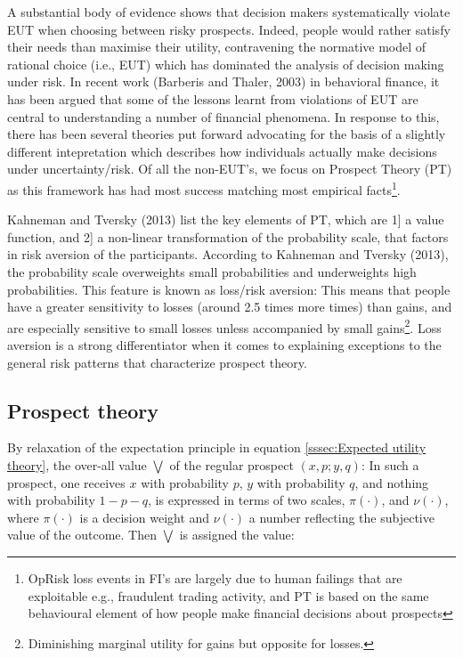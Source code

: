 \documentclass[]{DissertateUSU}
\let\rmarkdownfootnote\footnote%
\def\footnote{\protect\rmarkdownfootnote}
\begin{document}
A substantial body of evidence shows that decision makers systematically
violate EUT when choosing between risky prospects. Indeed, people would
rather satisfy their needs than maximise their utility, contravening the
normative model of rational choice (i.e., EUT) which has dominated the
analysis of decision making under risk. In recent work (Barberis and
Thaler, 2003) in behavioral finance, it has been argued that some of the
lessons learnt from violations of EUT are central to understanding a
number of financial phenomena. In response to this, there has been
several theories put forward advocating for the basis of a slightly
different intepretation which describes how individuals actually make
decisions under uncertainty/risk. Of all the non-EUT's, we focus on
Prospect Theory (PT) as this framework has had most success matching
most empirical
facts\footnote{OpRisk loss events in FI's are largely due to human failings that are exploitable e.g., fraudulent trading activity, and PT is based on the same behavioural element of how people make financial decisions about prospects}.\medskip 

Kahneman and Tversky (2013) list the key elements of PT, which are 1{]}
a value function, and 2{]} a non-linear transformation of the
probability scale, that factors in risk aversion of the participants.
According to Kahneman and Tversky (2013), the probability scale
overweights small probabilities and underweights high probabilities.
This feature is known as loss/risk aversion: This means that people have
a greater sensitivity to losses (around 2.5 times more times) than
gains, and are especially sensitive to small losses unless accompanied
by small
gains\footnote{Diminishing marginal utility for gains but opposite for losses.}.
Loss aversion is a strong differentiator when it comes to explaining
exceptions to the general risk patterns that characterize prospect
theory.\medskip 

\subsection{Prospect theory}
\label{ssec:Prospect theory}

By relaxation of the expectation principle in equation
\ref{sssec:Expected utility theory}, the over-all value
\(\mathbf{\bigvee}\) of the regular prospect \((x,p;y,q)\): In such a
prospect, one receives \(x\) with probability \(p\), \(y\) with
probability \(q\), and nothing with probability \(1-p-q\), is expressed
in terms of two scales, \(\pi(\cdot)\), and \(\nu(\cdot)\), where
\(\pi(\cdot)\) is a decision weight and \(\nu(\cdot)\) a number
reflecting the subjective value of the outcome. Then
\(\mathbf{\bigvee}\) is assigned the value:
\end{document}
